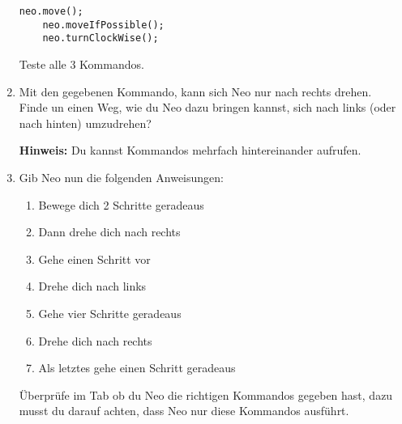 \begin{enumerate}
        \begin{lstlisting}[firstnumber=20]
    neo.move();
    neo.moveIfPossible();
    neo.turnClockWise();
        \end{lstlisting}

        Teste alle 3 Kommandos.\\
    \item Mit den gegebenen Kommando, kann sich Neo nur nach rechts drehen.\\
        Finde un einen Weg, wie du Neo dazu bringen kannst, sich nach links (oder nach hinten) umzudrehen?

        \textbf{Hinweis:} Du kannst Kommandos mehrfach hintereinander aufrufen.
    \item Gib Neo nun die folgenden Anweisungen:
        
        {
            \begin{enumerate}
                \item Bewege dich 2 Schritte geradeaus
                \item Dann drehe dich nach rechts
                \item Gehe einen Schritt vor
                \item Drehe dich nach links
                \item Gehe vier Schritte geradeaus
                \item Drehe dich nach rechts
                \item Als letztes gehe einen Schritt geradeaus
            \end{enumerate}
        }

        Überprüfe im  Tab ob du Neo die richtigen Kommandos gegeben hast, dazu musst du darauf achten, dass Neo nur diese Kommandos ausführt.
\end{enumerate}

